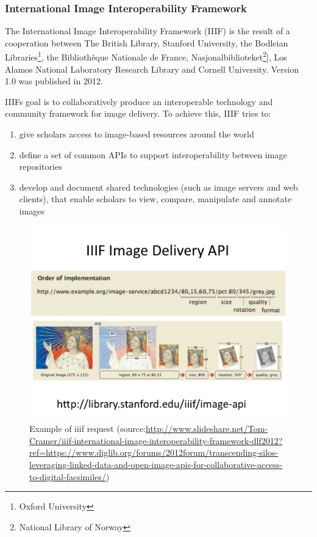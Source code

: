 \subsubsection{International Image Interoperability Framework}
The International Image Interoperability Framework (IIIF) is the result of a cooperation between The British Library, Stanford University, the Bodleian Libraries\footnote{Oxford University}, the Bibliothèque Nationale de France, Nasjonalbiblioteket\footnote{National Library of Norway}], Los Alamos National Laboratory Research Library and Cornell University\cite{Cramer11}. Version 1.0 was published in 2012.

IIIFs goal is to collaboratively produce an interoperable technology and community framework for image delivery\cite{web:iiif2}. To achieve this, IIIF tries to:
\begin{enumerate}[(1)]
	\item give scholars access to image-based resources around the world
	\item define a set of common APIs to support interoperability between image repositories
	\item develop and document shared technologies (such as image servers and web clients), that enable scholars to view, compare, manipulate and annotate images
\end{enumerate}

\begin{figure}[H]
	\begin{center}
		\includegraphics[scale=0.3]{img/iiif_url_example.jpg}
		\caption{Example of iiif request (source:\url{http://www.slideshare.net/Tom-Cramer/iiif-international-image-interoperability-framework-dlf2012?ref=https://www.diglib.org/forums/2012forum/transcending-silos-leveraging-linked-data-and-open-image-apis-for-collaborative-access-to-digital-facsimiles/})}
		\label{fig2_iiifExample}
	\end{center}
\end{figure}

